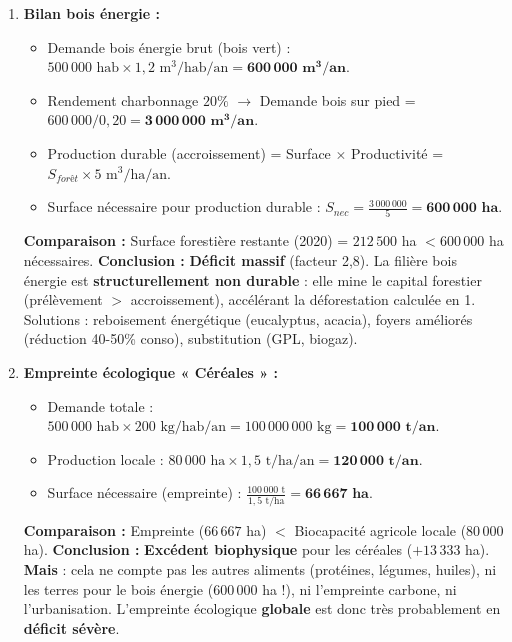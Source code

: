 \documentclass[11pt]{article}
\begin{document}
\begin{exoresolu}
\begin{enumerate}
        \item \textbf{Bilan bois énergie :}
        \begin{itemize}
            \item Demande bois énergie brut (bois vert) : $500\,000 \text{ hab} \times 1,2 \text{ m}^3/\text{hab/an} = \mathbf{600\,000 \text{ m}^3/an}$.
            \item Rendement charbonnage $20\%$ $\rightarrow$ Demande bois sur pied = $600\,000 / 0,20 = \mathbf{3\,000\,000 \text{ m}^3/an}$.
            \item Production durable (accroissement) = Surface $\times$ Productivité = $S_{forêt} \times 5 \text{ m}^3/\text{ha/an}$.
            \item Surface nécessaire pour production durable : $S_{nec} = \frac{3\,000\,000}{5} = \mathbf{600\,000 \text{ ha}}$.
        \end{itemize}
        \textbf{Comparaison :} Surface forestière restante (2020) = $212\,500$ ha $< 600\,000$ ha nécessaires.
        \textbf{Conclusion :} \textbf{Déficit massif} (facteur 2,8). La filière bois énergie est \textbf{structurellement non durable} : elle mine le capital forestier (prélèvement $>$ accroissement), accélérant la déforestation calculée en 1. Solutions : reboisement énergétique (eucalyptus, acacia), foyers améliorés (réduction 40-50\% conso), substitution (GPL, biogaz).
        \item \textbf{Empreinte écologique « Céréales » :}
        \begin{itemize}
            \item Demande totale : $500\,000 \text{ hab} \times 200 \text{ kg/hab/an} = 100\,000\,000 \text{ kg} = \mathbf{100\,000 \text{ t/an}}$.
            \item Production locale : $80\,000 \text{ ha} \times 1,5 \text{ t/ha/an} = \mathbf{120\,000 \text{ t/an}}$.
            \item Surface nécessaire (empreinte) : $\frac{100\,000 \text{ t}}{1,5 \text{ t/ha}} = \mathbf{66\,667 \text{ ha}}$.
        \end{itemize}
        \textbf{Comparaison :} Empreinte ($66\,667$ ha) $<$ Biocapacité agricole locale ($80\,000$ ha).
        \textbf{Conclusion :} \textbf{Excédent biophysique} pour les céréales ($+13\,333$ ha). \textbf{Mais} : cela ne compte pas les autres aliments (protéines, légumes, huiles), ni les terres pour le bois énergie ($600\,000$ ha !), ni l'empreinte carbone, ni l'urbanisation. L'empreinte écologique \textbf{globale} est donc très probablement en \textbf{déficit sévère}.
    \end{enumerate}
\end{exoresolu}
\end{document}
